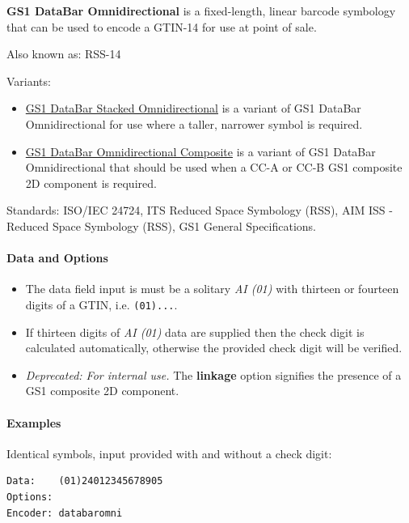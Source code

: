 \textbf{GS1 DataBar Omnidirectional} is a fixed-length, linear barcode
symbology that can be used to encode a GTIN-14 for use at point of sale.

Also known as: RSS-14

Variants:

\begin{itemize}
\tightlist
\item
  \protect\hyperlink{gs1-databar-stacked-omnidirectional}{GS1 DataBar
  Stacked Omnidirectional} is a variant of GS1 DataBar Omnidirectional
  for use where a taller, narrower symbol is required.
\item
  \protect\hyperlink{gs1-composite-symbols}{GS1 DataBar Omnidirectional
  Composite} is a variant of GS1 DataBar Omnidirectional that should be
  used when a CC-A or CC-B GS1 composite 2D component is required.
\end{itemize}

Standards: ISO/IEC 24724, ITS Reduced Space Symbology (RSS), AIM ISS -
Reduced Space Symbology (RSS), GS1 General Specifications.

\hypertarget{data-and-options-34}{%
\paragraph{Data and Options}\label{data-and-options-34}}

\begin{itemize}
\tightlist
\item
  The data field input is must be a solitary \emph{AI (01)} with
  thirteen or fourteen digits of a GTIN, i.e. \texttt{(01)...}.
\item
  If thirteen digits of \emph{AI (01)} data are supplied then the check
  digit is calculated automatically, otherwise the provided check digit
  will be verified.
\item
  \emph{Deprecated: For internal use.} The \textbf{linkage} option
  signifies the presence of a GS1 composite 2D component.
\end{itemize}

\hypertarget{examples-24}{%
\paragraph{Examples}\label{examples-24}}

Identical symbols, input provided with and without a check digit:

\begin{verbatim}
Data:    (01)24012345678905
Options: 
Encoder: databaromni
\end{verbatim}

